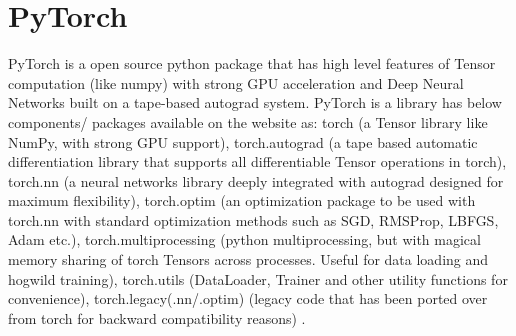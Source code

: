 \section{PyTorch}
PyTorch is a open source python package that has high level features of Tensor computation (like numpy) with strong GPU acceleration and Deep Neural Networks built on a tape-based autograd system. PyTorch is a library has below components/ packages available on the website as: torch (a Tensor library like NumPy, with strong GPU support), torch.autograd (a tape based automatic differentiation library that supports all differentiable Tensor operations in torch), torch.nn (a neural networks library deeply integrated with autograd designed for maximum flexibility), torch.optim (an optimization package to be used with torch.nn with standard optimization methods such as SGD, RMSProp, LBFGS, Adam etc.), torch.multiprocessing (python multiprocessing, but with magical memory sharing of torch Tensors across processes. Useful for data loading and hogwild training), torch.utils (DataLoader, Trainer and other utility functions for convenience), torch.legacy(.nn/.optim) (legacy code that has been ported over from torch for backward compatibility reasons) \cite{PyTorch}.

